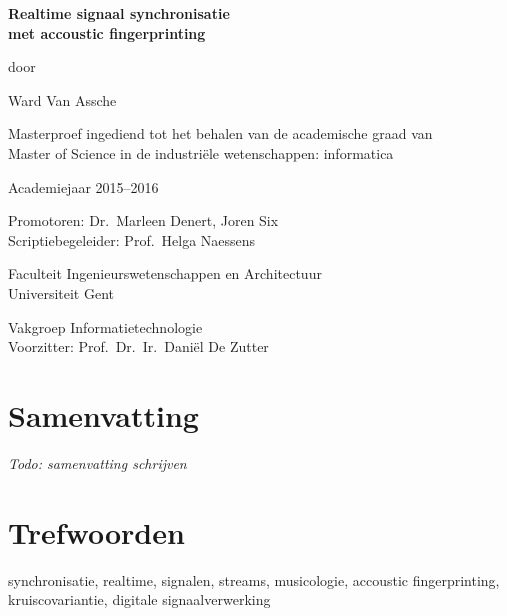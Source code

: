 
\newpage

{
\setlength{\baselineskip}{14pt}
\setlength{\parindent}{0pt}
\setlength{\parskip}{8pt}

\begin{center}

\noindent \textbf{\huge
Realtime signaal synchronisatie\\[8pt]
met accoustic fingerprinting
}

door 

Ward Van Assche

Masterproef ingediend tot het behalen van de academische graad van\\
Master of Science in de industriële wetenschappen: informatica

Academiejaar 2015--2016

Promotoren: Dr.~Marleen Denert, Joren Six\\
Scriptiebegeleider: Prof.~Helga Naessens

Faculteit Ingenieurswetenschappen en Architectuur\\
Universiteit Gent

Vakgroep Informatietechnologie\\
Voorzitter: Prof.~Dr.~Ir.~Dani\"{e}l De Zutter


\end{center}

\section*{Samenvatting}


\textit{Todo: samenvatting schrijven}




\section*{Trefwoorden}


synchronisatie, realtime, signalen, streams, musicologie, accoustic fingerprinting, kruiscovariantie, digitale signaalverwerking

}
\newpage %
